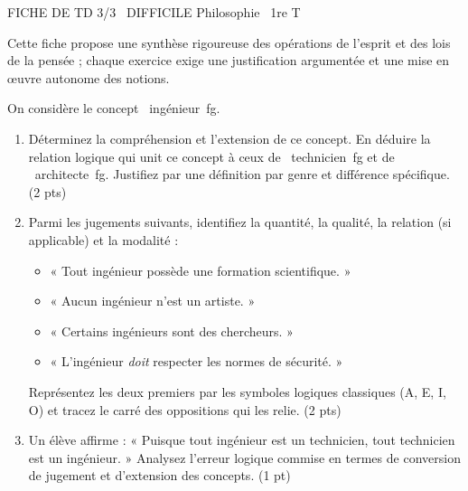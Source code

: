 \documentclass[11pt]{article}
\begin{document}
\begin{tcolorbox}[enhanced,colback=popink,colframe=popink,arc=10pt,boxrule=0pt,left=12pt,right=12pt,top=9pt,bottom=9pt]
{\color{white}\popxbold\small FICHE DE TD 3/3 \textbullet\ DIFFICILE \hfill Philosophie \textbullet\ 1re T\par}
\end{tcolorbox}
\vspace{4pt}
Cette fiche propose une synthèse rigoureuse des opérations de l'esprit et des lois de la pensée ; chaque exercice exige une justification argumentée et une mise en œuvre autonome des notions.

\begin{exercice}
On considère le concept \og~ingénieur~fg. 
\begin{enumerate}
    \item Déterminez la compréhension et l'extension de ce concept. En déduire la relation logique qui unit ce concept à ceux de \og~technicien~fg et de \og~architecte~fg. Justifiez par une définition par genre et différence spécifique. (2 pts)
    \item Parmi les jugements suivants, identifiez la quantité, la qualité, la relation (si applicable) et la modalité : 
    \begin{itemize}
        \item « Tout ingénieur possède une formation scientifique. »
        \item « Aucun ingénieur n'est un artiste. »
        \item « Certains ingénieurs sont des chercheurs. »
        \item « L'ingénieur \textit{doit} respecter les normes de sécurité. »
    \end{itemize}
    Représentez les deux premiers par les symboles logiques classiques (A, E, I, O) et tracez le carré des oppositions qui les relie. (2 pts)
    \item Un élève affirme : « Puisque tout ingénieur est un technicien, tout technicien est un ingénieur. » Analysez l'erreur logique commise en termes de conversion de jugement et d'extension des concepts. (1 pt)
\end{enumerate}
\end{exercice}
\end{document}
